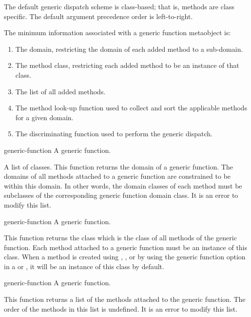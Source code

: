 %
\begin{optDefinition}
The default generic dispatch scheme is class-based; that is, methods
are class specific.  The default argument precedence order is
left-to-right.

The minimum information associated with a generic function metaobject is:

\begin{enumerate}
    \item The domain, restricting the domain of each added method to a
    sub-domain.
    \item The method class, restricting each added method to be an instance
    of that class.
    \item The list of all added methods.
    \item The method look-up function used to collect and sort the
    applicable methods for a given domain.
    \item The discriminating function used to perform the generic dispatch.
\end{enumerate}

%
\begin{arguments}
    \item[generic-function] A generic function.
\end{arguments}
%
\result%
A list of classes.
%
\remarks%
This function returns the domain of a generic function. The domains of all
methods attached to a generic function are constrained to be within this domain.
In other words, the domain classes of each method must be subclasses of the
corresponding generic function domain class.  It is an error to modify this
list.

%
\begin{arguments}
    \item[generic-function] A generic function.
\end{arguments}
%
\result%
This function returns the class which is the class of all methods of the generic
function.  Each method attached to a generic function must be an instance of
this class. When a method is created using ,
, or by using the  generic function
option in a  or , it will be an
instance of this class by default.

%
\begin{arguments}
    \item[generic-function] A generic function.
\end{arguments}
%
\result%
This function returns a list of the methods attached to the generic function.
The order of the methods in this list is undefined.  It is an error to modify
this list.


\end{optDefinition}
